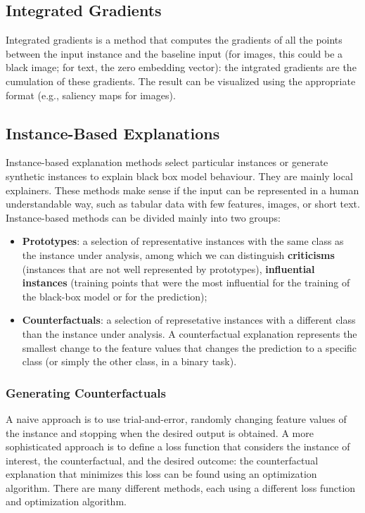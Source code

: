 \subsection{Integrated Gradients}

Integrated gradients is a method that computes the gradients of all the points between the input instance and the baseline input (for images, this could be a black image; for text, the zero embedding vector): the intgrated gradients are the cumulation of these gradients. The result can be visualized using the appropriate format (e.g., saliency maps for images).

\subsection{Instance-Based Explanations}

Instance-based explanation methods select particular instances or generate synthetic instances to explain black box model behaviour. They are mainly local explainers. These methods make sense if the input can be represented in a human understandable way, such as tabular data with few features, images, or short text. Instance-based methods can be divided mainly into two groups:
\begin{itemize}
    \item \textbf{Prototypes}: a selection of representative instances with the same class as the instance under analysis, among which we can distinguish \textbf{criticisms} (instances that are not well represented  by prototypes), \textbf{influential instances} (training points that were the most influential for the training of the black-box model or for the prediction);
    
    \item \textbf{Counterfactuals}: a selection of represetative instances with a different class than the instance under analysis. A counterfactual explanation represents the smallest change to the feature values that changes the prediction to a specific class (or simply the other class, in a binary task).
\end{itemize}

\subsubsection{Generating Counterfactuals}

A naive approach is to use trial-and-error, randomly changing feature values of the instance and stopping when the desired output is obtained. A more sophisticated approach is to define a loss function that considers the instance of interest, the counterfactual, and the desired outcome: the counterfactual explanation that minimizes this loss can be found using an optimization algorithm. There are many different methods, each using a different loss function and optimization algorithm.

